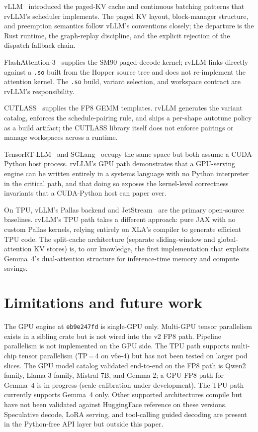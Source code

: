 vLLM~\cite{kwon2023vllm} introduced the paged-KV cache and continuous
batching patterns that rvLLM's scheduler implements. The paged KV
layout, block-manager structure, and preemption semantics follow vLLM's
conventions closely; the departure is the Rust runtime, the graph-replay
discipline, and the explicit rejection of the dispatch fallback chain.

FlashAttention-3~\cite{shah2024flash3} supplies the SM90 paged-decode
kernel; rvLLM links directly against a \texttt{.so} built from the
Hopper source tree and does not re-implement the attention kernel. The
\texttt{.so} build, variant selection, and workspace contract are
rvLLM's responsibility.

CUTLASS~\cite{cutlass2024} supplies the FP8 GEMM templates. rvLLM
generates the variant catalog, enforces the schedule-pairing rule, and
ships a per-shape autotune policy as a build artifact; the CUTLASS
library itself does not enforce pairings or manage workspaces across a
runtime.

TensorRT-LLM~\cite{tensorrt_llm} and SGLang~\cite{sglang2024} occupy the
same space but both assume a CUDA-Python host process. rvLLM's GPU path
demonstrates that a GPU-serving engine can be written entirely in a
systems language with no Python interpreter in the critical path, and
that doing so exposes the kernel-level correctness invariants that a
CUDA-Python host can paper over.

On TPU, vLLM's Pallas backend and JetStream~\cite{jetstream2024} are the
primary open-source baselines. rvLLM's TPU path takes a different
approach: pure JAX with no custom Pallas kernels, relying entirely on
XLA's compiler to generate efficient TPU code. The split-cache
architecture (separate sliding-window and global-attention KV stores)
is, to our knowledge, the first implementation that exploits Gemma~4's
dual-attention structure for inference-time memory and compute savings.

\section{Limitations and future work}
\label{sec:limitations}

The GPU engine at \texttt{eb9e247fd} is single-GPU only. Multi-GPU
tensor parallelism exists in a sibling crate but is not wired into the
v2 FP8 path. Pipeline parallelism is not implemented on the GPU side.
The TPU path supports multi-chip tensor parallelism (TP\,=\,4 on v6e-4)
but has not been tested on larger pod slices. The GPU model catalog
validated end-to-end on the FP8 path is Qwen2 family, Llama 3 family,
Mistral 7B, and Gemma 2; a GPU FP8 path for Gemma~4 is in progress
(scale calibration under development). The TPU path currently supports
Gemma~4 only. Other supported architectures compile but have not been
validated against HuggingFace reference on these versions.
Speculative decode, LoRA serving, and tool-calling guided decoding are
present in the Python-free API layer but outside this paper.


